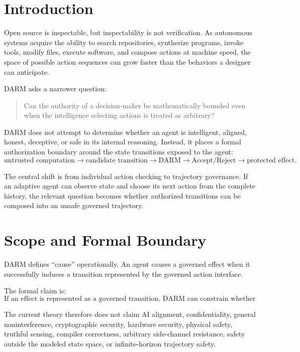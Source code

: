 \documentclass[11pt]{article}
\begin{document}
\section{Introduction}
Open source is inspectable, but inspectability is not verification. As autonomous systems acquire the ability to search repositories, synthesize programs, invoke tools, modify files, execute software, and compose actions at machine speed, the space of possible action sequences can grow faster than the behaviors a designer can anticipate.

DARM asks a narrower question:
\begin{quote}
Can the authority of a decision-maker be mathematically bounded even when the intelligence selecting actions is treated as arbitrary?
\end{quote}

DARM does not attempt to determine whether an agent is intelligent, aligned, honest, deceptive, or safe in its internal reasoning. Instead, it places a formal authorization boundary around the state transitions exposed to the agent:
\[
\text{untrusted computation}
\rightarrow
\text{candidate transition}
\rightarrow
\text{DARM}
\rightarrow
\text{Accept/Reject}
\rightarrow
\text{protected effect}.
\]

The central shift is from individual action checking to trajectory governance. If an adaptive agent can observe state and choose its next action from the complete history, the relevant question becomes whether authorized transitions can be composed into an unsafe governed trajectory.

\section{Scope and Formal Boundary}
DARM defines ``cause'' operationally. An agent causes a governed effect when it successfully induces a transition represented by the governed action interface.

The formal claim is:
\[
\boxed{\text{If an effect is represented as a governed transition, DARM can constrain whether that transition is authorized.}}
\]

The current theory therefore does not claim AI alignment, confidentiality, general noninterference, cryptographic security, hardware security, physical safety, truthful sensing, compiler correctness, arbitrary side-channel resistance, safety outside the modeled state space, or infinite-horizon trajectory safety.
\end{document}
